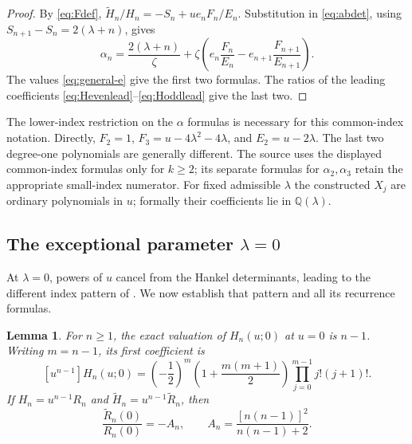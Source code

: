 \documentclass[11pt]{article}
\numberwithin{equation}{section}
\newtheorem{lemma}[theorem]{Lemma}
\theoremstyle{remark}
\newcommand{\Q}{\mathbb{Q}}
\newcommand{\wt}{\widetilde}
\begin{document}
\begin{proof}
By \eqref{eq:Fdef}, $\wt H_n/H_n=-S_n+ue_nF_n/E_n$.
Substitution in \eqref{eq:abdet}, using $S_{n+1}-S_n=2(\lambda+n)$,
gives
\[
 \alpha_n=\frac{2(\lambda+n)}\zeta+
       \zeta\left(e_n\frac{F_n}{E_n}-e_{n+1}\frac{F_{n+1}}{E_{n+1}}\right).
\]
The values \eqref{eq:general-e} give the first two formulas.
The ratios of the leading coefficients
\eqref{eq:Hevenlead}--\eqref{eq:Hoddlead} give the last two.
\end{proof}

The lower-index restriction on the $\alpha$ formulas is necessary for
this common-index notation. Directly,
$F_2=1$, $F_3=u-4\lambda^2-4\lambda$, and $E_2=u-2\lambda$.
The last two degree-one polynomials are generally different.
The source uses the displayed common-index formulas only for $k\ge2$;
its separate formulas for $\alpha_2,\alpha_3$ retain the appropriate
small-index numerator. For fixed admissible $\lambda$ the constructed
$X_j$ are ordinary polynomials in $u$; formally their coefficients lie
in $\Q(\lambda)$.

\subsection{The exceptional parameter \texorpdfstring{$\lambda=0$}{lambda=0}}

At $\lambda=0$, powers of $u$ cancel from the Hankel determinants,
leading to the different index pattern of
\cite[Conjecture~2.7]{LyuZhou2026}. We now establish that pattern
and all its recurrence formulas.

\begin{lemma}\label{lem:valuation}
For $n\ge1$, the exact valuation of $H_n(u;0)$ at $u=0$ is $n-1$.
Writing $m=n-1$, its first coefficient is
\begin{equation}\label{eq:lowcoefficient}
 [u^{n-1}]H_n(u;0)=
 \left(-\frac12\right)^m
 \left(1+\frac{m(m+1)}2\right)\prod_{j=0}^{m-1}j!(j+1)!.
\end{equation}
If $H_n=u^{n-1}R_n$ and $\wt H_n=u^{n-1}\wt R_n$, then
\begin{equation}\label{eq:zeroRshift}
 \frac{\wt R_n(0)}{R_n(0)}=-A_n,
 \qquad A_n=\frac{[n(n-1)]^2}{n(n-1)+2}.
\end{equation}
\end{lemma}
\end{document}
